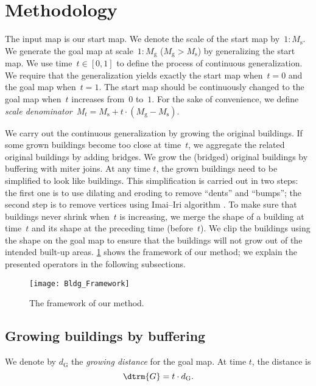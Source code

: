 \section{Methodology}
\label{sec:Methodology}
The input map is our start map.
We denote the scale of the start map by~$1:M_\mathrm{s}$.
We generate the goal map at scale~$1:M_\mathrm{g}$ 
($M_\mathrm{g} > M_\mathrm{s}$) by generalizing the start map. 
We use time~$t\in[0,1]$ to define 
the process of continuous generalization. 
We require that 
the generalization yields exactly the start map when~$t=0$ 
and the goal map when~$t=1$.
The start map should be continuously changed to the goal map 
when~$t$ increases from~$0$ to~$1$.
For the sake of convenience, we define 
\emph{scale denominator}~$M_t= 
M_\mathrm{s} + t \cdot (M_\mathrm{g}-M_\mathrm{s})$.

We carry out the continuous generalization 
by growing the original buildings. 
If some grown buildings become too close at time~$t$,
we aggregate the related original buildings by adding bridges.
We grow the (bridged) original buildings 
by buffering with miter joins.
At any time $t$, the grown buildings 
need to be simplified to look like buildings.
This simplification is carried out in two steps:
the first one is to use dilating and eroding 
to remove ``dents'' and ``bumps''; 
the second step is to remove vertices 
using Imai--Iri algorithm \citep{ImaiIri1988}.
To make sure that buildings never shrink 
when~$t$ is increasing,
we merge the shape of a building at time~$t$ 
and its shape at the preceding time (before~$t$). 
We clip the buildings using the shape on the goal map to 
ensure that the buildings will not 
grow out of the intended built-up areas.
\fig\ref{fig:Bldg_Framework} shows 
the framework of our method;
we explain the presented operators
in the following subsections.
 
\begin{figure}[tb]
	\centering
	\texttt{[image: Bldg\_Framework]}
	\caption{The framework of our method.}
	\label{fig:Bldg_Framework}
\end{figure}


\subsection{Growing buildings by buffering}
\label{sec:Grow}
We denote by $d_\mathrm{G}$ 
the \emph{growing distance} for the goal map.
At time $t$, the distance is
\begin{equation}
\label{eq:d_Gt}
\dtrm{G} = t \cdot d_\mathrm{G}.
\end{equation}

